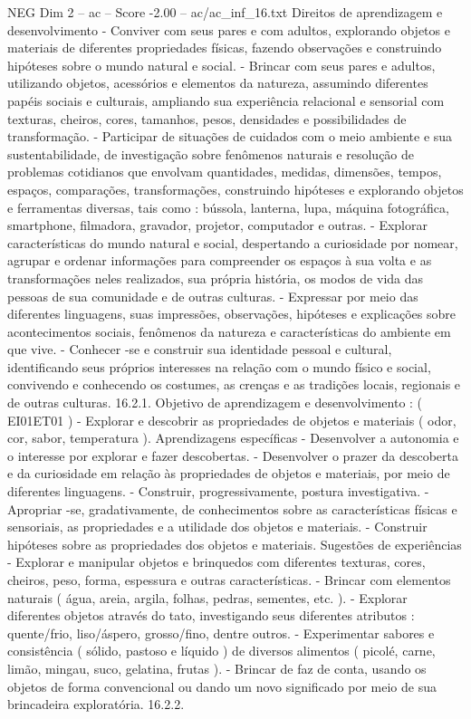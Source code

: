 \begin{textsample}{NEG Dim 2 – ac – Score -2.00 – ac/ac\_inf\_16.txt}
Direitos de aprendizagem e desenvolvimento - Conviver com seus pares e com adultos, explorando objetos e materiais de diferentes propriedades físicas, fazendo observações e construindo hipóteses sobre o mundo natural e social. - Brincar com seus pares e adultos, utilizando objetos, acessórios e elementos da natureza, assumindo diferentes papéis sociais e culturais, ampliando sua experiência relacional e sensorial com texturas, cheiros, cores, tamanhos, pesos, densidades e possibilidades de transformação. - Participar de situações de cuidados com o meio ambiente e sua sustentabilidade, de investigação sobre fenômenos naturais e resolução de problemas cotidianos que envolvam quantidades, medidas, dimensões, tempos, espaços, comparações, transformações, construindo hipóteses e explorando objetos e ferramentas diversas, tais como : bússola, lanterna, lupa, máquina fotográfica, smartphone, filmadora, gravador, projetor, computador e outras. - Explorar características do mundo natural e social, despertando a curiosidade por nomear, agrupar e ordenar informações para compreender os espaços à sua volta e as transformações neles realizados, sua própria história, os modos de vida das pessoas de sua comunidade e de outras culturas. - Expressar por meio das diferentes linguagens, suas impressões, observações, hipóteses e explicações sobre acontecimentos sociais, fenômenos da natureza e características do ambiente em que vive. - Conhecer -se e construir sua identidade pessoal e cultural, identificando seus próprios interesses na relação com o mundo físico e social, convivendo e conhecendo os costumes, as crenças e as tradições locais, regionais e de outras culturas. 16.2.1.
Objetivo de aprendizagem e desenvolvimento : ( EI01ET01 ) - Explorar e descobrir as propriedades de objetos e materiais ( odor, cor, sabor, temperatura ).
Aprendizagens específicas - Desenvolver a autonomia e o interesse por explorar e fazer descobertas. - Desenvolver o prazer da descoberta e da curiosidade em relação às propriedades de objetos e materiais, por meio de diferentes linguagens. - Construir, progressivamente, postura investigativa. - Apropriar -se, gradativamente, de conhecimentos sobre as características físicas e sensoriais, as propriedades e a utilidade dos objetos e materiais. - Construir hipóteses sobre as propriedades dos objetos e materiais.
Sugestões de experiências - Explorar e manipular objetos e brinquedos com diferentes texturas, cores, cheiros, peso, forma, espessura e outras características. - Brincar com elementos naturais ( água, areia, argila, folhas, pedras, sementes, etc. ). - Explorar diferentes objetos através do tato, investigando seus diferentes atributos : quente/frio, liso/áspero, grosso/fino, dentre outros. - Experimentar sabores e consistência ( sólido, pastoso e líquido ) de diversos alimentos ( picolé, carne, limão, mingau, suco, gelatina, frutas ). - Brincar de faz de conta, usando os objetos de forma convencional ou dando um novo significado por meio de sua brincadeira exploratória. 16.2.2.

\end{textsample}
